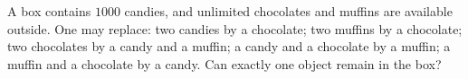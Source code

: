 A box contains $1000$ candies, and unlimited chocolates and muffins are available outside. One may replace: two candies by a chocolate; two muffins by a chocolate; two chocolates by a candy and a muffin; a candy and a chocolate by a muffin; a muffin and a chocolate by a candy. Can exactly one object remain in the box?
